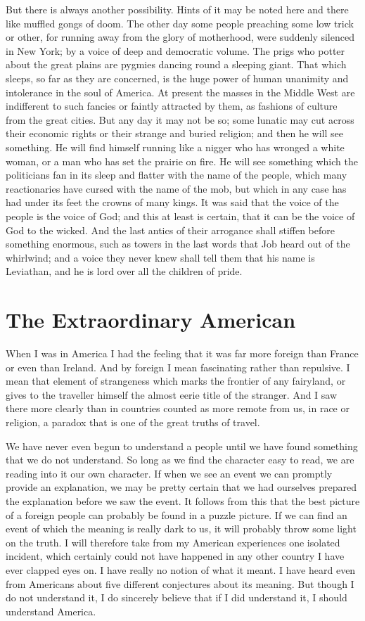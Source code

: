 \documentclass{book}
\begin{document}
But there is always another possibility. Hints of it may be noted here and there like muffled gongs of doom. The other day some people preaching some low trick or other, for running away from the glory of motherhood, were suddenly silenced in New York; by a voice of deep and democratic volume. The prigs who potter about the great plains are pygmies dancing round a sleeping giant. That which sleeps, so far as they are concerned, is the huge power of human unanimity and intolerance in the soul of America. At present the masses in the Middle West are indifferent to such fancies or faintly attracted by them, as fashions of culture from the great cities. But any day it may not be so; some lunatic may cut across their economic rights or their strange and buried religion; and then he will see something. He will find himself running like a nigger who has wronged a white woman, or a man who has set the prairie on fire. He will see something which the politicians fan in its sleep and flatter with the name of the people, which many reactionaries have cursed with the name of the mob, but which in any case has had under its feet the crowns of many kings. It was said that the voice of the people is the voice of God; and this at least is certain, that it can be the voice of God to the wicked. And the last antics of their arrogance shall stiffen before something enormous, such as towers in the last words that Job heard out of the whirlwind; and a voice they never knew shall tell them that his name is Leviathan, and he is lord over all the children of pride.

\chapter{The Extraordinary American}
\label{chapter-10}
When I was in America I had the feeling that it was far more foreign than France or even than Ireland. And by foreign I mean fascinating rather than repulsive. I mean that element of strangeness which marks the frontier of any fairyland, or gives to the traveller himself the almost eerie title of the stranger. And I saw there more clearly than in countries counted as more remote from us, in race or religion, a paradox that is one of the great truths of travel.

We have never even begun to understand a people until we have found something that we do not understand. So long as we find the character easy to read, we are reading into it our own character. If when we see an event we can promptly provide an explanation, we may be pretty certain that we had ourselves prepared the explanation before we saw the event. It follows from this that the best picture of a foreign people can probably be found in a puzzle picture. If we can find an event of which the meaning is really dark to us, it will probably throw some light on the truth. I will therefore take from my American experiences one isolated incident, which certainly could not have happened in any other country I have ever clapped eyes on. I have really no notion of what it meant. I have heard even from Americans about five different conjectures about its meaning. But though I do not understand it, I do sincerely believe that if I did understand it, I should understand America.
\end{document}
